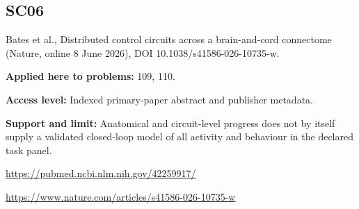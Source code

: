 \documentclass[11pt]{article}
\begin{document}
\subsection*{SC06}\label{check:SC06}

Bates et al., Distributed control circuits across a brain-and-cord connectome (Nature, online 8 June 2026), DOI 10.1038/s41586-026-10735-w.

\textbf{Applied here to problems:} 109, 110.

\textbf{Access level:} Indexed primary-paper abstract and publisher metadata.

\textbf{Support and limit:} Anatomical and circuit-level progress does not by itself supply a validated closed-loop model of all activity and behaviour in the declared task panel.

\url{https://pubmed.ncbi.nlm.nih.gov/42259917/}

\url{https://www.nature.com/articles/s41586-026-10735-w}
\end{document}
